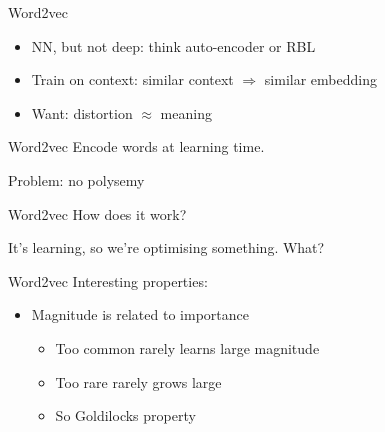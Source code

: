 \documentclass[t,aspectratio=169]{beamer}
\begin{document}
\begin{frame}{Word2vec}
  \begin{itemize}
  \item NN, but not deep: think auto-encoder or RBL
  \item Train on context: similar context $\Rightarrow$ similar embedding
  \item Want: distortion $\approx$ meaning 
  \end{itemize}

  
\end{frame}

\begin{frame}{Word2vec}
  Encode words at learning time.

  \bigskip
  \centerline{}
  \bigskip

  Problem: no polysemy

\end{frame}

\begin{frame}{Word2vec}
  How does it work?

  It's learning, so we're optimising something.  What?


\end{frame}

\begin{frame}{Word2vec}
  Interesting properties:

  \begin{itemize}
  \item Magnitude is related to importance
    \begin{itemize}
    \item Too common rarely learns large magnitude
    \item Too rare rarely grows large
    \item So Goldilocks property
    \end{itemize}
  \end{itemize}
\end{frame}
\end{document}
